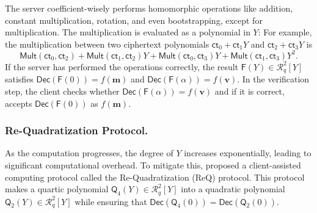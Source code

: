 \documentclass[runningheads]{llncs}
\newcommand{\bb}[1]{\mathbb{#1}}  %
\newcommand{\cc}[1]{\mathcal{#1}} %
\newcommand{\ct}{\textsf{ct}{}}
\newcommand{\PE}{\textsf{PE}{}}
\newcommand{\REQ}{\textsf{ReQ}}
\newcommand{\dec}{\textsf{Dec}}
\newcommand{\enc}{\textsf{Enc}}
\begin{document}
        \begin{center}
        \end{center}
        
    The server coefficient-wisely performs homomorphic operations like addition, constant multiplication, rotation, and even bootstrapping, except for multiplication. 
    The multiplication is evaluated as a polynomial in $Y$:
    For example, the multiplication between two ciphertext polynomials $\ct_0+\ct_1Y$ and $\ct_2+\ct_3Y$ is 
        \[
            \mathsf{Mult}(\ct_0,\ct_2)+\mathsf{Mult}(\ct_1,\ct_2)Y+\mathsf{Mult}(\ct_0,\ct_3)Y+\mathsf{Mult}(\ct_1,\ct_3)Y^2.
        \]
    If the server has performed the operations correctly, the result $\mathsf F(Y)\in \cc R^2_q[Y]$ satisfies $\dec(\mathsf F(0)) = f(\mathbf{m})$ and $\dec(\mathsf F(\alpha)) = f(\mathbf{v})$. 
    In the verification step, the client checks whether $\dec(\mathsf F(\alpha))=f(\mathbf{v})$ and if it is correct, accepts $\dec(\mathsf F(0))$ as $f(\mathbf{m})$.
    
        \subsubsection{Re-Quadratization Protocol.} 
        As the computation progresses, the degree of $Y$ increases exponentially, leading to significant computational overhead. To mitigate this, \cite{VE} proposed a client-assisted computing protocol called the Re-Quadratization (\REQ) protocol.
        This protocol makes a quartic polynomial $\mathsf{Q}_4(Y)\in \cc R^2_q[Y]$ into a quadratic polynomial $\mathsf{Q}_2(Y)\in \cc R^2_q[Y]$ while ensuring that $\dec(\mathsf{Q}_4(0))=\dec(\mathsf{Q}_2(0))$.
    
\end{document}

